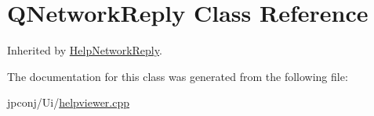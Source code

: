 \hypertarget{class_q_network_reply}{}\section{Q\+Network\+Reply Class Reference}
\label{class_q_network_reply}


Inherited by \hyperlink{class_help_network_reply}{Help\+Network\+Reply}.



The documentation for this class was generated from the following file\+:\begin{DoxyCompactItemize}
\item 
jpconj/\+Ui/\hyperlink{helpviewer_8cpp}{helpviewer.\+cpp}\end{DoxyCompactItemize}
